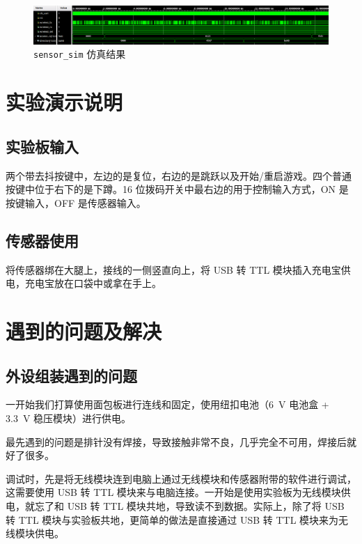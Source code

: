 \documentclass[UTF8, 11pt, fontset=none]{ctexart}
\begin{document}
\begin{figure}[H]
    \centering
    \includegraphics[width=\textwidth]{images/sensor-sim.png}
    \vspace{-16pt}
    \caption{\texttt{sensor_sim} 仿真结果}
\end{figure}

\section{实验演示说明}

\subsection{实验板输入}

两个带去抖按键中，左边的是复位，右边的是跳跃以及开始/重启游戏。四个普通按键中位于右下的是下蹲。16 位拨码开关中最右边的用于控制输入方式，ON 是按键输入，OFF 是传感器输入。

\subsection{传感器使用}

将传感器绑在大腿上，接线的一侧竖直向上，将 USB 转 TTL 模块插入充电宝供电，充电宝放在口袋中或拿在手上。

\section{遇到的问题及解决}

\subsection{外设组装遇到的问题}

一开始我们打算使用面包板进行连线和固定，使用纽扣电池（\SI{6}{\volt} 电池盒 + \SI{3.3}{\volt} 稳压模块）进行供电。

最先遇到的问题是排针没有焊接，导致接触非常不良，几乎完全不可用，焊接后就好了很多。

调试时，先是将无线模块连到电脑上通过无线模块和传感器附带的软件进行调试，这需要使用 USB 转 TTL 模块来与电脑连接。一开始是使用实验板为无线模块供电，就忘了和 USB 转 TTL 模块共地，导致读不到数据。实际上，除了将 USB 转 TTL 模块与实验板共地，更简单的做法是直接通过 USB 转 TTL 模块来为无线模块供电。
\end{document}
